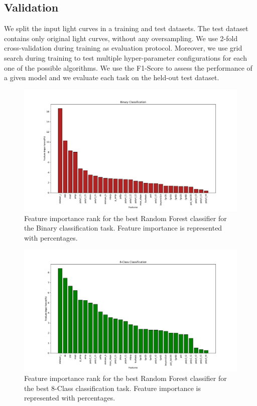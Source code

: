 \documentclass[a4paper,fleqn,usenatbib]{mnras}
\begin{document}
\subsection{Validation} \label{subsection_importances}

We split the input light curves in a training and test datasets. 
The test dataset contains only original light curves, without any
oversampling. 
We use 2-fold cross-validation during training as evaluation
protocol. 
Moreover, we use grid search during training to test multiple
hyper-parameter configurations for each one  of the possible
algorithms. 
We use the F1-Score to assess the performance of a given model and 
we evaluate each task on the held-out test dataset.


\begin{figure}
	\includegraphics[width=\textwidth]{binFeatImportance.pdf}
    \caption{Feature importance rank  for the best Random Forest
      classifier for the Binary classification task. 
      Feature importance is represented with percentages.} 
    \label{Importances-Binary}
\end{figure} 

\begin{figure}
	\includegraphics[width=\textwidth]{8classFeatImportance.pdf}
    \caption{Feature importance rank for the best Random Forest
      classifier for the best 8-Class classification task. Feature
      importance is represented with percentages.} 
    \label{Importances-8-Class}
\end{figure}
\end{document}
